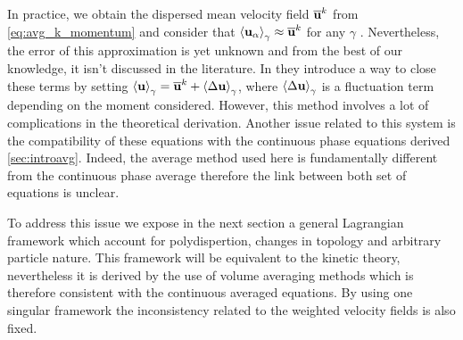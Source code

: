 In practice, we obtain the dispersed mean velocity field $\overline{\textbf{u}}^k$ from \ref{eq:avg_k_momentum} and consider that $\left<\textbf{u}_\alpha\right>_{\gamma} \approx \overline{\textbf{u}}^k$ for any $\gamma$ \citep{morel2010comparison,KAMP20011363}. 
Nevertheless, the error of this approximation is yet unknown and from the best of our knowledge, it isn't discussed in the literature. 
In \citet{zaepffel2011modelisation} they introduce a way to close these terms by setting $\left<\textbf{u}\right>_{\gamma} = \overline{\textbf{u}}^k + \left<\Delta \textbf{u}\right>_{\gamma}$, where $\left<\Delta \textbf{u}\right>_{\gamma}$ is a fluctuation term depending on the moment considered.
However, this method involves a lot of complications in the theoretical derivation. 
Another issue related to this system is the compatibility of these equations with the continuous phase equations derived \ref{sec:introavg}.
Indeed, the average method used here is fundamentally different from the continuous phase average therefore the link between both set of equations is unclear. 

To address this issue we expose in the next section a general Lagrangian framework which account for polydispertion, changes in topology and arbitrary particle nature. 
This framework will be equivalent to the kinetic theory, nevertheless it is derived by the use of volume averaging methods which is therefore consistent with the continuous averaged equations. 
By using one singular framework the inconsistency related to the weighted velocity fields is also fixed. 


